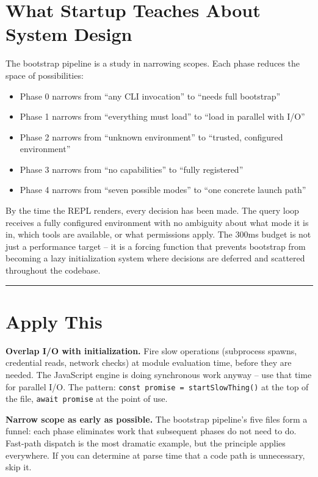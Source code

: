 \documentclass[
  english,
  11pt,
  letterpaper,
]{book}
\providecommand{\tightlist}{%
  \setlength{\itemsep}{0pt}\setlength{\parskip}{0pt}}
\begin{document}
\section{What Startup Teaches About System
Design}\label{what-startup-teaches-about-system-design}

The bootstrap pipeline is a study in narrowing scopes. Each phase
reduces the space of possibilities:

\begin{itemize}
\tightlist
\item
  Phase 0 narrows from ``any CLI invocation'' to ``needs full
  bootstrap''
\item
  Phase 1 narrows from ``everything must load'' to ``load in parallel
  with I/O''
\item
  Phase 2 narrows from ``unknown environment'' to ``trusted, configured
  environment''
\item
  Phase 3 narrows from ``no capabilities'' to ``fully registered''
\item
  Phase 4 narrows from ``seven possible modes'' to ``one concrete launch
  path''
\end{itemize}

By the time the REPL renders, every decision has been made. The query
loop receives a fully configured environment with no ambiguity about
what mode it is in, which tools are available, or what permissions
apply. The 300ms budget is not just a performance target -- it is a
forcing function that prevents bootstrap from becoming a lazy
initialization system where decisions are deferred and scattered
throughout the codebase.

\begin{center}\rule{0.5\linewidth}{0.5pt}\end{center}

\section{Apply This}\label{apply-this-1}

\textbf{Overlap I/O with initialization.} Fire slow operations
(subprocess spawns, credential reads, network checks) at module
evaluation time, before they are needed. The JavaScript engine is doing
synchronous work anyway -- use that time for parallel I/O. The pattern:
\texttt{const\ promise\ =\ startSlowThing()} at the top of the file,
\texttt{await\ promise} at the point of use.

\textbf{Narrow scope as early as possible.} The bootstrap pipeline's
five files form a funnel: each phase eliminates work that subsequent
phases do not need to do. Fast-path dispatch is the most dramatic
example, but the principle applies everywhere. If you can determine at
parse time that a code path is unnecessary, skip it.
\end{document}

